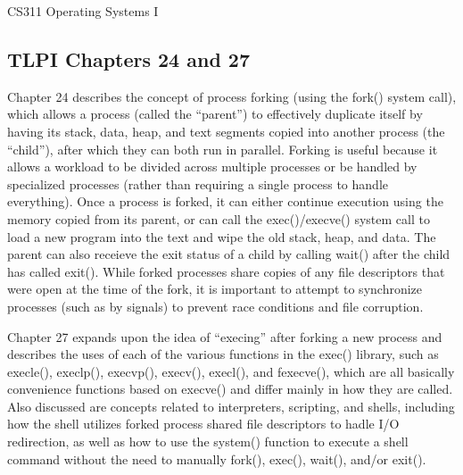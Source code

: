 \documentclass[letterpaper,10pt,fleqn]{article}
\numberwithin{equation}{section}
\begin{document}



{\Large CS311 Operating Systems I}

\subsection*{TLPI Chapters 24 and 27}

Chapter 24 describes the concept of process forking (using the fork() system call), which allows a process (called the ``parent'') to effectively duplicate itself by having its stack, data, heap, and text segments copied into another process (the ``child''), after which they can both run in parallel.  Forking is useful because it allows a workload to be divided across multiple processes or be handled by specialized processes (rather than requiring a single process to handle everything).  Once a process is forked, it can either continue execution using the memory copied from its parent, or can call the exec()/execve() system call to load a new program into the text and wipe the old stack, heap, and data.  The parent can also receieve the exit status of a child by calling wait() after the child has called exit().  While forked processes share copies of any file descriptors that were open at the time of the fork, it is important to attempt to synchronize processes (such as by signals) to prevent race conditions and file corruption.

Chapter 27 expands upon the idea of ``execing'' after forking a new process and describes the uses of each of the various functions in the exec() library, such as execle(), execlp(), execvp(), execv(), execl(), and fexecve(), which are all basically convenience functions based on execve() and differ mainly in how they are called.  Also discussed are concepts related to interpreters, scripting, and shells, including how the shell utilizes forked process shared file descriptors to hadle I/O redirection, as well as how to use the system() function to execute a shell command without the need to manually fork(), exec(), wait(), and/or exit().
\end{document}
